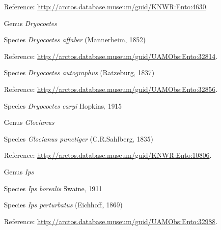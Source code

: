 \documentclass[9pt, article]{memoir}
\begin{document}
\begin{multicols}{2}
\vspace{6pt}Reference: 
\url{http://arctos.database.museum/guid/KNWR:Ento:4630}.

\vspace{6pt}\noindent\hspace{30pt}Genus \textit{Dryocoetes}


\vspace{6pt}\noindent\hspace{36pt}Species \textit{Dryocoetes affaber} (Mannerheim, 1852)


\vspace{6pt}Reference: 
\url{http://arctos.database.museum/guid/UAMObs:Ento:32814}.

\vspace{6pt}\noindent\hspace{36pt}Species \textit{Dryocoetes autographus} (Ratzeburg, 1837)


\vspace{6pt}Reference: 
\url{http://arctos.database.museum/guid/UAMObs:Ento:32856}.

\vspace{6pt}\noindent\hspace{36pt}Species \textit{Dryocoetes caryi} Hopkins, 1915


\vspace{6pt}\noindent\hspace{30pt}Genus \textit{Glocianus}


\vspace{6pt}\noindent\hspace{36pt}Species \textit{Glocianus punctiger} (C.R.Sahlberg, 1835)


\vspace{6pt}Reference: 
\url{http://arctos.database.museum/guid/KNWR:Ento:10806}.

\vspace{6pt}\noindent\hspace{30pt}Genus \textit{Ips}


\vspace{6pt}\noindent\hspace{36pt}Species \textit{Ips borealis} Swaine, 1911


\vspace{6pt}\noindent\hspace{36pt}Species \textit{Ips perturbatus} (Eichhoff, 1869)


\vspace{6pt}Reference: 
\url{http://arctos.database.museum/guid/UAMObs:Ento:32988}.


\end{multicols}
\end{document}
